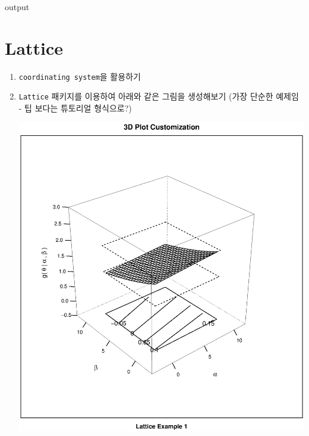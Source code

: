 \documentclass[../tutorial.tex]{subfiles}
\begin{document}
\begin{Schunk}
\begin{Soutput}
output
\end{Soutput}
\end{Schunk}










\section{Lattice}

\begin{enumerate}

\item \texttt{coordinating system}을 활용하기

\item \texttt{Lattice} 패키지를 이용하여 아래와 같은 그림을 생성해보기 (가장 단순한 예제임 - 팁 보다는 튜토리얼 형식으로?)

\includegraphics{./img/lattice-fig.eps}



\end{enumerate}
\end{document}
